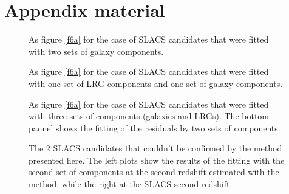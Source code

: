 \documentclass[12pt,preprint]{aastex}
\begin{document}
\appendix

\section{Appendix material}\label{appendix}

\begin{figure}[h]
\caption{As figure \ref{f6a} for the case of SLACS candidates that were fitted with two sets of galaxy components.}
\label{f6}
\end{figure}


\begin{figure}[h]
\caption{As figure \ref{f6a} for the case of SLACS candidates that were fitted with one set of LRG components and one set of galaxy components.}
\label{f7}
\end{figure}

\begin{figure}[h]
\caption{As figure \ref{f6a} for the case of SLACS candidates that were fitted with three sets of components (galaxies and LRGs). The bottom pannel shows the fitting of the residuals by two sets of components.}
\label{f8}
\end{figure}

\begin{figure}[h]
\begin{center}
\caption{The 2 SLACS candidates that couldn't be confirmed by the method presented here. The left plots show the results of the fitting with the second set of components at the second redshift estimated with the method, while the right at the SLACS second redshift.}
\label{f9}
\end{center}
\end{figure}
\end{document}
